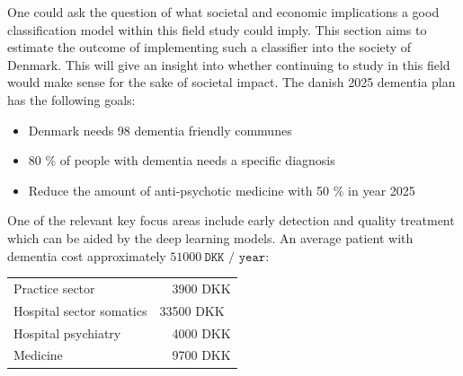\documentclass[12pt, fleqn, titlepage]{article}
\begin{document}
One could ask the question of what societal and economic implications a good classification model within this field study could imply. This section aims to estimate the outcome of implementing such a classifier into the society of Denmark. This will give an insight into whether continuing to study in this field would make sense for the sake of societal impact. The danish 2025 dementia plan has the following goals:

\begin{itemize}
	\item Denmark needs 98 dementia friendly communes
	\item 80 \% of people with dementia needs a specific diagnosis 
	\item Reduce the amount of anti-psychotic medicine with 50 \% in year 2025
\end{itemize}
\noindent
One of the relevant key focus areas include early detection and quality treatment which can be aided by the deep learning models. An average patient with dementia cost approximately $ 51000 \ \texttt{DKK / year}$:

		
		\begin{table}[H]
			\begin{tabular}{ll}
				Practice sector   &\ \ 3900  DKK  \\
				Hospital sector somatics  & 33500 DKK \\
				Hospital psychiatry  &  \ \ 4000  DKK  \\
				Medicine & \ \ 9700  DKK 
			\end{tabular}
		\end{table}
		
\end{document}
